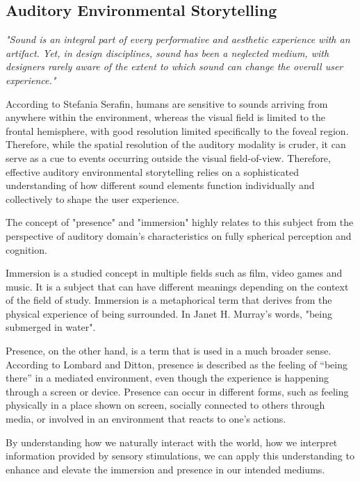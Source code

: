        \subsection{Auditory Environmental Storytelling}
            \emph{"Sound is an integral part of every performative and aesthetic experience with an artifact. Yet, in design disciplines, sound has been a neglected medium, with designers rarely aware of the extent to which sound can change the overall user experience."\cite{Sonic_Interaction_Design}}

            According to Stefania Serafin, humans are sensitive to sounds arriving from anywhere within the environment, whereas the visual field is limited to the frontal hemisphere, with good resolution limited specifically to the foveal region. Therefore, while the spatial resolution of the auditory modality is cruder, it can serve as a cue to events occurring outside the visual field-of-view\cite{Sonic_Interaction_in_Virtual_Environments}. Therefore, effective auditory environmental storytelling relies on a sophisticated understanding of how different sound elements function individually and collectively to shape the user experience.\par

            The concept of "presence" and "immersion" highly relates to this subject from the perspective of auditory domain's characteristics on fully spherical perception and cognition.\par

            Immersion is a studied concept in multiple fields such as film, video games and music. It is a subject that can have different meanings depending on the context of the field of study\cite{Sonic_Interaction_in_Virtual_Environments}. Immersion is a metaphorical term that derives from the physical experience of being surrounded. In Janet H. Murray's words, "being submerged in water"\cite{Hamlet_on_the_Holodeck}. 

            Presence, on the other hand, is a term that is used in a much broader sense. According to Lombard and Ditton, presence is described as the feeling of “being there” in a mediated environment, even though the experience is happening through a screen or device. Presence can occur in different forms, such as feeling physically in a place shown on screen, socially connected to others through media, or involved in an environment that reacts to one’s actions\cite{Concept_of_Presence}.

            By understanding how we naturally interact with the world, how we interpret information provided by sensory stimulations, we can apply this understanding to enhance and elevate the immersion and presence in our intended mediums.\par

